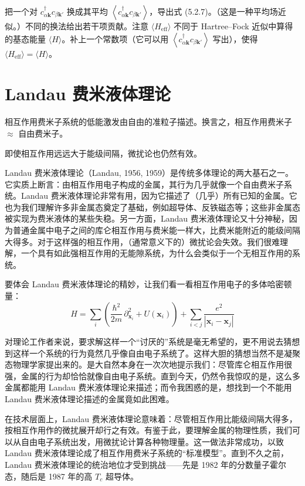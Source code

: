 把一个对 $c^{\dagger}_{\alpha\pmb{k}} c_{\beta\pmb{k}'}$ 换成其平均 $\left\langle c^{\dagger}_{\alpha\pmb{k}} c_{\beta\pmb{k}'} \right\rangle$，导出式 (5.2.7)。（这是一种平均场近似。）不同的换法给出若干项贡献。注意 $\langle H_{\mathrm{eff}} \rangle$ 不同于 Hartree--Fock 近似中算得的基态能量 $\langle H \rangle$。补上一个常数项（它可以用 $\left\langle c^{\dagger}_{\alpha\pmb{k}} c_{\beta\pmb{k}'} \right\rangle$ 写出），使得 $\langle H_{\mathrm{eff}} \rangle = \langle H \rangle$。

\section{Landau 费米液体理论}

\begin{keypoints}
\item 相互作用费米子系统的低能激发由自由的准粒子描述。换言之，相互作用费米子 $\approx$ 自由费米子。
\item 即使相互作用远远大于能级间隔，微扰论也仍然有效。
\end{keypoints}

Landau 费米液体理论（Landau, 1956, 1959）是传统多体理论的两大基石之一。它实质上断言：由相互作用电子构成的金属，其行为几乎就像一个自由费米子系统。Landau 费米液体理论非常有用，因为它描述了（几乎）所有已知的金属。它也为我们理解许多非金属态奠定了基础，例如超导体、反铁磁态等；这些非金属态被实现为费米液体的某些失稳。另一方面，Landau 费米液体理论又十分神秘，因为普通金属中电子之间的库仑相互作用与费米能一样大，比费米能附近的能级间隔大得多。对于这样强的相互作用，（通常意义下的）微扰论会失效。我们很难理解，一个具有如此强相互作用的无能隙系统，为什么会类似于一个无相互作用的系统。

要体会 Landau 费米液体理论的精妙，让我们看一看相互作用电子的多体哈密顿量：
\begin{equation*}
H = \sum_{i} \left( \frac{\hbar^{2}}{2m}\, \partial^{2}_{\pmb{x}_i} + U(\pmb{x}_i) \right) + \sum_{i<j} \frac{e^{2}}{|\pmb{x}_i - \pmb{x}_j|}
\end{equation*}

对理论工作者来说，要求解这样一个“讨厌的”系统是毫无希望的，更不用说去猜想到这样一个系统的行为竟然几乎像自由电子系统了。这样大胆的猜想当然不是凝聚态物理学家提出来的。是大自然本身在一次次地提示我们：尽管库仑相互作用很强，金属的行为却恰恰就像自由电子系统。直到今天，仍然令我惊叹的是，这么多金属都能用 Landau 费米液体理论来描述；而令我困惑的是，想找到一个不能用 Landau 费米液体理论描述的金属竟如此困难。

在技术层面上，Landau 费米液体理论意味着：尽管相互作用比能级间隔大得多，按相互作用作的微扰展开却行之有效。有鉴于此，要理解金属的物理性质，我们可以从自由电子系统出发，用微扰论计算各种物理量。这一做法非常成功，以致 Landau 费米液体理论成了相互作用费米子系统的“标准模型”。直到不久之前，Landau 费米液体理论的统治地位才受到挑战——先是 1982 年的分数量子霍尔态，随后是 1987 年的高 $T_c$ 超导体。

